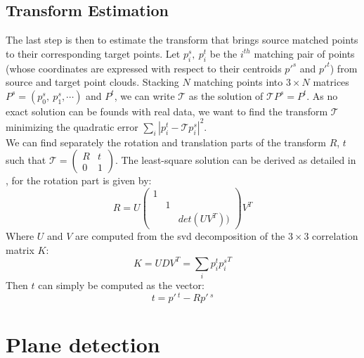 \subsection{Transform Estimation} 
    
    The last step is then to estimate the transform that brings source matched points to their corresponding target points. Let $p_i^s, \:p_i^t$ be the $i^{th}$ matching pair of points (whose coordinates are expressed with respect to their centroids $p'^s$ and $p'^t$) from source and target point clouds. Stacking $N$ matching points into $3\times N$ matrices $P^s = \left ( p_0^s,\:p_1^s, \cdots  \right )$ and $P^t$, we can write $\mathcal{T}$ as the solution of $\mathcal{T}P^s = P^t$. As no exact solution can be founds with real data, we want to find the transform $\mathcal{T}$ minimizing the quadratic error $\sum_i\left | p_i^t - \mathcal{T}p_i^s \right |^2$. \\
    We can find separately the rotation and translation parts of the transform $R$, $t$ such that 
    $\mathcal{T}=\begin{pmatrix}
    R & t\\ 
    0 & 1
    \end{pmatrix}$.
    The least-square solution can be derived as detailed in \cite{sork2017}, for the rotation part is given by: 
    \[
    R=U\begin{pmatrix}
    1 &  & \\ 
     & 1 & \\ 
     &  & det(UV^T))
    \end{pmatrix}V^T
    \]
    Where $U$ and $V$ are computed from the \acrshort{svd} decomposition of the $3\times 3$ correlation matrix $K$:
    \[
    K=UDV^T=\sum_i p_i^t{p_i^s}^T
    \]
    Then $t$ can simply be computed as the vector: 
    \[
        t=p'\,^t-Rp'\,^s
    \]

\section{Plane detection}

